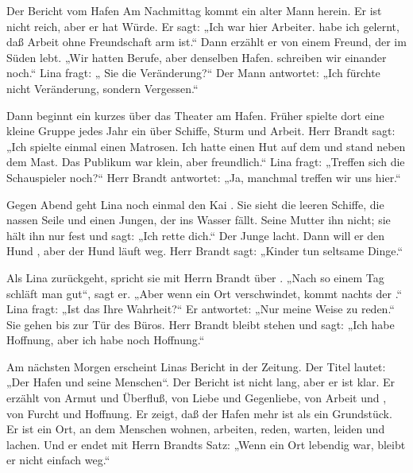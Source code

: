 \documentclass[12pt]{nextbook}
\begin{document}
\begin{readersection}{Der Bericht vom Hafen}
Am Nachmittag kommt ein alter Mann herein. Er ist nicht reich, aber er hat Würde. Er sagt: „Ich war hier Arbeiter.  habe ich gelernt, daß Arbeit ohne Freundschaft arm ist.“ Dann erzählt er von einem Freund, der  im Süden lebt. „Wir hatten  Berufe, aber denselben Hafen.  schreiben wir einander noch.“ Lina fragt: „ Sie die Veränderung?“ Der Mann antwortet: „Ich fürchte nicht Veränderung, sondern Vergessen.“

Dann beginnt ein kurzes  über das Theater am Hafen. Früher spielte dort eine kleine Gruppe jedes Jahr ein  über Schiffe, Sturm und Arbeit. Herr Brandt sagt: „Ich spielte einmal einen Matrosen. Ich hatte einen Hut auf dem  und stand neben dem Mast. Das Publikum war klein, aber freundlich.“ Lina fragt: „Treffen sich die Schauspieler noch?“ Herr Brandt antwortet: „Ja, manchmal treffen wir uns hier.“

Gegen Abend geht Lina noch einmal den Kai . Sie sieht die leeren Schiffe, die nassen Seile und einen Jungen, der  ins Wasser fällt. Seine Mutter  ihn nicht; sie hält ihn nur fest und sagt: „Ich rette dich.“ Der Junge lacht. Dann will er den Hund , aber der Hund läuft weg. Herr Brandt sagt: „Kinder tun seltsame Dinge.“

Als Lina zurückgeht, spricht sie mit Herrn Brandt über . „Nach so einem Tag schläft man gut“, sagt er. „Aber wenn ein Ort verschwindet, kommt nachts der .“ Lina fragt: „Ist das Ihre Wahrheit?“ Er antwortet: „Nur meine Weise zu reden.“ Sie gehen bis zur Tür des Büros. Herr Brandt bleibt stehen und sagt: „Ich habe  Hoffnung, aber ich habe noch Hoffnung.“

Am nächsten Morgen erscheint Linas Bericht in der Zeitung. Der Titel lautet: „Der Hafen und seine Menschen“. Der Bericht ist nicht  lang, aber er ist klar. Er erzählt von Armut und Überfluß, von Liebe und Gegenliebe, von Arbeit und , von Furcht und Hoffnung. Er zeigt, daß der Hafen mehr ist als ein Grundstück. Er ist ein Ort, an dem Menschen wohnen, arbeiten, reden, warten, leiden und lachen. Und er endet mit Herrn Brandts Satz: „Wenn ein Ort lebendig war, bleibt er nicht einfach weg.“

\end{readersection}
\end{document}

